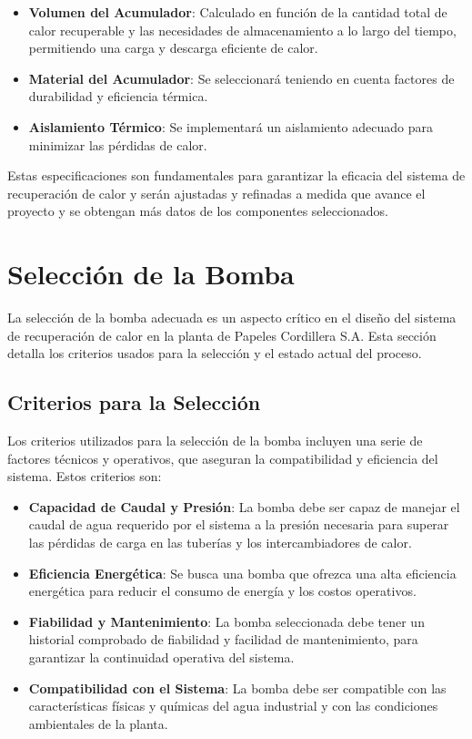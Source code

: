 \documentclass[11pt,a4paper]{article}  %
\begin{document}
\begin{itemize}
    \item \textbf{Volumen del Acumulador}: Calculado en función de la cantidad total de calor recuperable y las necesidades de almacenamiento a lo largo del tiempo, permitiendo una carga y descarga eficiente de calor.
    \item \textbf{Material del Acumulador}: Se seleccionará teniendo en cuenta factores de durabilidad y eficiencia térmica.
    \item \textbf{Aislamiento Térmico}: Se implementará un aislamiento adecuado para minimizar las pérdidas de calor.
\end{itemize}

Estas especificaciones son fundamentales para garantizar la eficacia del sistema de recuperación de calor y serán ajustadas y refinadas a medida que avance el proyecto y se obtengan más datos de los componentes seleccionados.

\section{Selección de la Bomba}

La selección de la bomba adecuada es un aspecto crítico en el diseño del sistema de recuperación de calor en la planta de Papeles Cordillera S.A. Esta sección detalla los criterios usados para la selección y el estado actual del proceso.

\subsection{Criterios para la Selección}
Los criterios utilizados para la selección de la bomba incluyen una serie de factores técnicos y operativos, que aseguran la compatibilidad y eficiencia del sistema. Estos criterios son:

\begin{itemize}
    \item \textbf{Capacidad de Caudal y Presión}: La bomba debe ser capaz de manejar el caudal de agua requerido por el sistema a la presión necesaria para superar las pérdidas de carga en las tuberías y los intercambiadores de calor.
    
    \item \textbf{Eficiencia Energética}: Se busca una bomba que ofrezca una alta eficiencia energética para reducir el consumo de energía y los costos operativos.
    
    \item \textbf{Fiabilidad y Mantenimiento}: La bomba seleccionada debe tener un historial comprobado de fiabilidad y facilidad de mantenimiento, para garantizar la continuidad operativa del sistema.
    
    \item \textbf{Compatibilidad con el Sistema}: La bomba debe ser compatible con las características físicas y químicas del agua industrial y con las condiciones ambientales de la planta.
\end{itemize}
\end{document}

